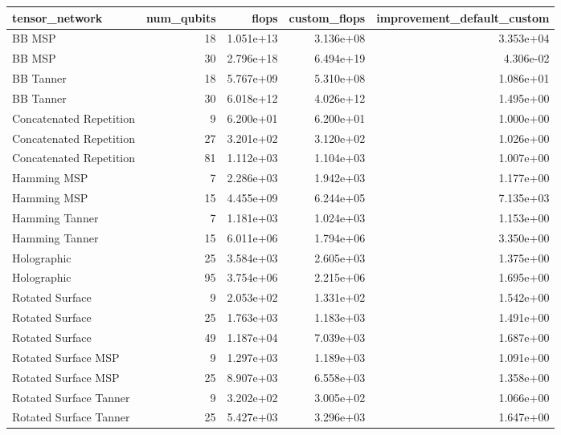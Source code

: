 \begin{tabular}{lrrrr}
\toprule
tensor_network & num_qubits & flops & custom_flops & improvement_default_custom \\
\midrule
BB MSP & 18 & 1.051e+13 & 3.136e+08 & 3.353e+04 \\
BB MSP & 30 & 2.796e+18 & 6.494e+19 & 4.306e-02 \\
BB Tanner & 18 & 5.767e+09 & 5.310e+08 & 1.086e+01 \\
BB Tanner & 30 & 6.018e+12 & 4.026e+12 & 1.495e+00 \\
Concatenated Repetition & 9 & 6.200e+01 & 6.200e+01 & 1.000e+00 \\
Concatenated Repetition & 27 & 3.201e+02 & 3.120e+02 & 1.026e+00 \\
Concatenated Repetition & 81 & 1.112e+03 & 1.104e+03 & 1.007e+00 \\
Hamming MSP & 7 & 2.286e+03 & 1.942e+03 & 1.177e+00 \\
Hamming MSP & 15 & 4.455e+09 & 6.244e+05 & 7.135e+03 \\
Hamming Tanner & 7 & 1.181e+03 & 1.024e+03 & 1.153e+00 \\
Hamming Tanner & 15 & 6.011e+06 & 1.794e+06 & 3.350e+00 \\
Holographic & 25 & 3.584e+03 & 2.605e+03 & 1.375e+00 \\
Holographic & 95 & 3.754e+06 & 2.215e+06 & 1.695e+00 \\
Rotated Surface & 9 & 2.053e+02 & 1.331e+02 & 1.542e+00 \\
Rotated Surface & 25 & 1.763e+03 & 1.183e+03 & 1.491e+00 \\
Rotated Surface & 49 & 1.187e+04 & 7.039e+03 & 1.687e+00 \\
Rotated Surface MSP & 9 & 1.297e+03 & 1.189e+03 & 1.091e+00 \\
Rotated Surface MSP & 25 & 8.907e+03 & 6.558e+03 & 1.358e+00 \\
Rotated Surface Tanner & 9 & 3.202e+02 & 3.005e+02 & 1.066e+00 \\
Rotated Surface Tanner & 25 & 5.427e+03 & 3.296e+03 & 1.647e+00 \\
\bottomrule
\end{tabular}
